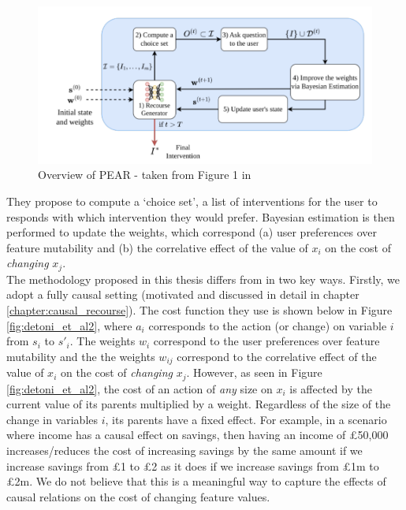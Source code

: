 \begin{figure}[!htb]
	\centering
	\includegraphics[width=0.75\linewidth]{images/detoni_et_al.png}
	\caption{Overview of PEAR - taken from Figure 1 in \textcite{detoniPersonalizedAlgorithmicRecourse2023}}
	\label{fig:detoni_et_al}
\end{figure}
\bigskip
They propose to compute a `choice set', a list of interventions for the user to responds with which intervention they would prefer. Bayesian estimation is then performed to update the weights, which correspond (a) user preferences over feature mutability and (b) the correlative effect of the value of $x_i$ on the cost of \textit{changing} $x_j$.\\

The methodology proposed in this thesis differs from \textcite{detoniPersonalizedAlgorithmicRecourse2023} in two key ways. Firstly, we adopt a fully causal setting (motivated and discussed in detail in chapter \ref{chapter:causal_recourse}). The cost function they use is shown below in Figure \ref{fig:detoni_et_al2}, where $a_i$ corresponds to the action (or change) on variable $i$ from $s_i$ to $s'_i$. The weights $w_i$ correspond to the user preferences over feature mutability and the the weights $w_{ij}$ correspond to the correlative effect of the value of $x_i$ on the cost of \textit{changing} $x_j$. However, as seen in Figure \ref{fig:detoni_et_al2}, the cost of an action of \textit{any} size on $x_i$ is affected by the current value of its parents multiplied by a weight. Regardless of the size of the change in variables $i$, its parents have a fixed effect. For example, in a scenario where income has a causal effect on savings, then having an income of £50,000 increases/reduces the cost of increasing savings by the same amount if we increase savings from £1 to £2 as it does if we increase savings from £1m to £2m. We do not believe that  this is a meaningful way to capture the effects of causal relations on the cost of changing feature values.\\

